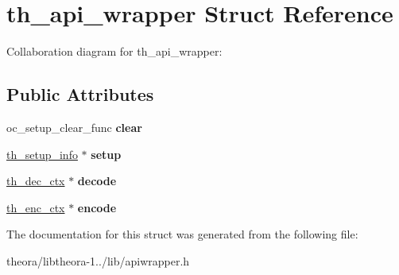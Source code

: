 \hypertarget{structth__api__wrapper}{\section{th\+\_\+api\+\_\+wrapper Struct Reference}
\label{structth__api__wrapper}
}


Collaboration diagram for th\+\_\+api\+\_\+wrapper\+:
\subsection*{Public Attributes}
\begin{DoxyCompactItemize}
\item 
\hypertarget{structth__api__wrapper_a4943f59eb41172c613db143250b8fb48}{oc\+\_\+setup\+\_\+clear\+\_\+func {\bfseries clear}}\label{structth__api__wrapper_a4943f59eb41172c613db143250b8fb48}

\item 
\hypertarget{structth__api__wrapper_ae78c17700bd17d104a2648beff66e274}{\hyperlink{structth__setup__info}{th\+\_\+setup\+\_\+info} $\ast$ {\bfseries setup}}\label{structth__api__wrapper_ae78c17700bd17d104a2648beff66e274}

\item 
\hypertarget{structth__api__wrapper_a7f5dbe1a0d6fc9a218c4be5e057439d6}{\hyperlink{structth__dec__ctx}{th\+\_\+dec\+\_\+ctx} $\ast$ {\bfseries decode}}\label{structth__api__wrapper_a7f5dbe1a0d6fc9a218c4be5e057439d6}

\item 
\hypertarget{structth__api__wrapper_ad58f9dad7784455261bbaebd57520f13}{\hyperlink{structth__enc__ctx}{th\+\_\+enc\+\_\+ctx} $\ast$ {\bfseries encode}}\label{structth__api__wrapper_ad58f9dad7784455261bbaebd57520f13}

\end{DoxyCompactItemize}


The documentation for this struct was generated from the following file\+:\begin{DoxyCompactItemize}
\item 
theora/libtheora-\/1../lib/apiwrapper.\+h\end{DoxyCompactItemize}
